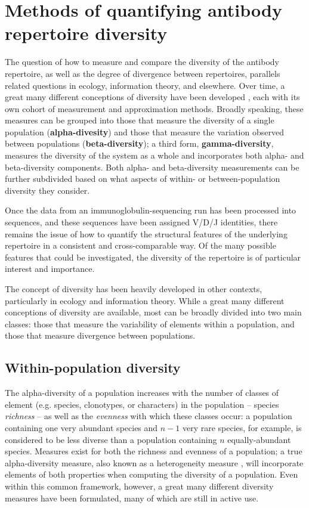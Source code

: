 \chapter{Methods of quantifying antibody repertoire diversity} %

The question of how to measure and compare the diversity of the antibody repertoire, as well as the degree of divergence between repertoires, parallels related questions in ecology, information theory, and elsewhere. Over time, a great many different conceptions of diversity have been developed \citep{peet1974diversity}, each with its own cohort of measurement and approximation methods. Broadly speaking, these measures can be grouped into those that measure the diversity of a single population (\textbf{alpha-divesity}) and those that measure the variation observed between populations (\textbf{beta-diversity}); a third form, \textbf{gamma-diversity}, measures the diversity of the system as a whole and incorporates both alpha- and beta-diversity components. Both alpha- and beta-diversity measurements can be further subdivided based on what aspects of within- or between-population diversity they consider. 


Once the data from an immunoglobulin-sequencing run has been processed into sequences, and these sequences have been assigned V/D/J identities, there remains the issue of how to quantify the structural features of the underlying repertoire in a consistent and cross-comparable way. Of the many possible features that could be investigated, the diversity of the repertoire is of particular interest and importance. 

The concept of diversity has been heavily developed in other contexts, particularly in ecology and information theory. While a great many different conceptions of diversity are available, most can be broadly divided into two main classes: those that measure the variability of elements within a population, and those that measure divergence between populations.

\section{Within-population diversity}
\label{sec:within}

The alpha-diversity of a population increases with the number of classes of element (e.g. species, clonotypes, or characters) in the population -- species \textit{richness} -- as well as the \textit{evenness} with which these classes occur: a population containing one very abundant species and $n-1$ very rare species, for example, is considered to be less diverse than a population containing $n$ equally-abundant species. %
Measures exist for both the richness and evenness of a population; a true alpha-diversity measure, also known as a heterogeneity measure \citep{peet1974diversity}, will incorporate elements of both properties when computing the diversity of a population. Even within this common framework, however, a great many different diversity measures have been formulated, many of which are still in active use. 

